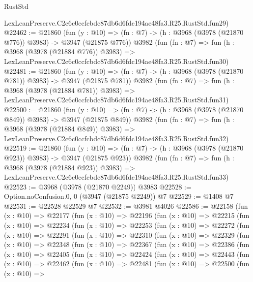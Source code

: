 \begin{lexlean}{RustStd}
\begin{coremodule}
    LexLeanPreserve.C2c6c0ccfcbdc87db6d6fdc194ae48fa3.R25.RustStd.fun29)
@22462 := @21860
    (fun (y : @10) => (fn : @7) -> (h : @3968 (@3978 (@21870 @776)) @3983) -> @3947 (@21875 @776))
    @3982
    (fun (fn : @7) =>
    fun (h : @3968 (@3978 (@21884 @776)) @3983) =>
    LexLeanPreserve.C2c6c0ccfcbdc87db6d6fdc194ae48fa3.R25.RustStd.fun30)
@22481 := @21860
    (fun (y : @10) => (fn : @7) -> (h : @3968 (@3978 (@21870 @781)) @3983) -> @3947 (@21875 @781))
    @3982
    (fun (fn : @7) =>
    fun (h : @3968 (@3978 (@21884 @781)) @3983) =>
    LexLeanPreserve.C2c6c0ccfcbdc87db6d6fdc194ae48fa3.R25.RustStd.fun31)
@22500 := @21860
    (fun (y : @10) => (fn : @7) -> (h : @3968 (@3978 (@21870 @849)) @3983) -> @3947 (@21875 @849))
    @3982
    (fun (fn : @7) =>
    fun (h : @3968 (@3978 (@21884 @849)) @3983) =>
    LexLeanPreserve.C2c6c0ccfcbdc87db6d6fdc194ae48fa3.R25.RustStd.fun32)
@22519 := @21860
    (fun (y : @10) => (fn : @7) -> (h : @3968 (@3978 (@21870 @923)) @3983) -> @3947 (@21875 @923))
    @3982
    (fun (fn : @7) =>
    fun (h : @3968 (@3978 (@21884 @923)) @3983) =>
    LexLeanPreserve.C2c6c0ccfcbdc87db6d6fdc194ae48fa3.R25.RustStd.fun33)
@22523 := @3968 (@3978 (@21870 @2249)) @3983
@22528 := Option.noConfusion.{0, 0} (@3947 (@21875 @2249)) @7
@22529 := @1408 @7
@22531 := @22528 @22529 @7
@22532 := @3981 @4026
@22586 := @22158
    (fun (x : @10) =>
    @22177
      (fun (x : @10) =>
      @22196
        (fun (x : @10) =>
        @22215
          (fun (x : @10) =>
          @22234
            (fun (x : @10) =>
            @22253
              (fun (x : @10) =>
              @22272
                (fun (x : @10) =>
                @22291
                  (fun (x : @10) =>
                  @22310
                    (fun (x : @10) =>
                    @22329
                      (fun (x : @10) =>
                      @22348
                        (fun (x : @10) =>
                        @22367
                          (fun (x : @10) =>
                          @22386
                            (fun (x : @10) =>
                            @22405
                              (fun (x : @10) =>
                              @22424
                                (fun (x : @10) =>
                                @22443
                                  (fun (x : @10) =>
                                  @22462
                                    (fun (x : @10) =>
                                    @22481
                                      (fun (x : @10) =>
                                      @22500
                                        (fun (x : @10) =>

\end{coremodule}
\end{lexlean}

